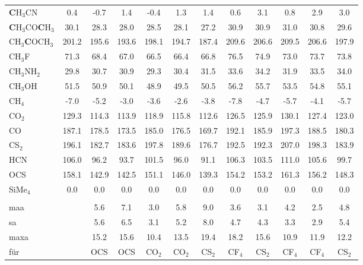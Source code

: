 \begin{table}[ht!]
{\begin{tabular}{lc|ccccc|ccccc}
    \textbf{C}H$_{3}$CN & 0.4   & -0.7  & 1.4   & -0.4  & 1.3   & 1.4   & 0.6   & 3.1   & 0.8   & 2.9   & 3.0 \\
    \textbf{C}H$_{3}$CO\textbf{C}H$_{3}$ & 30.1  & 28.3  & 28.0  & 28.5  & 28.1  & 27.2  & 30.9  & 30.9  & 31.0  & 30.8  & 29.6 \\
    CH$_{3}$\textbf{C}OCH$_{3}$ & 201.2 & 195.6 & 193.6 & 198.1 & 194.7 & 187.4 & 209.6 & 206.6 & 209.5 & 206.6 & 197.9 \\
    CH$_{3}$F  & 71.3  & 68.4  & 67.0  & 66.5  & 66.4  & 66.8  & 76.5  & 74.9  & 73.0  & 73.7  & 73.8 \\
    CH$_{3}$NH$_{2}$ & 29.8  & 30.7  & 30.9  & 29.3  & 30.4  & 31.5  & 33.6  & 34.2  & 31.9  & 33.5  & 34.0 \\
    CH$_{3}$OH & 51.5  & 50.9  & 50.1  & 48.9  & 49.5  & 50.5  & 56.2  & 55.7  & 53.5  & 54.8  & 55.1 \\
    CH$_{4}$   & -7.0  & -5.2  & -3.0  & -3.6  & -2.6  & -3.8  & -7.8  & -4.7  & -5.7  & -4.1  & -5.7 \\
    CO$_{2}$   & 129.3 & 114.3 & 113.9 & 118.9 & 115.8 & 112.6 & 126.5 & 125.9 & 130.1 & 127.4 & 123.0 \\
    CO    & 187.1 & 178.5 & 173.5 & 185.0 & 176.5 & 169.7 & 192.1 & 185.9 & 197.3 & 188.5 & 180.3 \\
    CS$_{2}$   & 196.1 & 182.7 & 183.6 & 197.8 & 189.6 & 176.7 & 192.5 & 192.3 & 207.0 & 198.3 & 183.9 \\
    HCN   & 106.0 & 96.2  & 93.7  & 101.5 & 96.0  & 91.1  & 106.3 & 103.5 & 111.0 & 105.6 & 99.7 \\
    OCS   & 158.1 & 142.9 & 142.5 & 151.1 & 146.0 & 139.3 & 154.2 & 153.2 & 161.3 & 156.2 & 148.3 \\
    SiMe$_{4}$ & 0.0   & 0.0   & 0.0   & 0.0   & 0.0   & 0.0   & 0.0   & 0.0   & 0.0   & 0.0   & 0.0 \\
          &       &       &       &       &       &       &       &       &       &       &  \\
    \ac{maa}   &       & 5.6   & 7.1   & 3.0   & 5.8   & 9.0   & 3.6   & 3.1   & 4.2   & 2.5   & 4.8 \\
    \ac{sa}   &       & 5.6   & 6.5   & 3.1   & 5.2   & 8.0   & 4.7   & 4.3   & 3.3   & 2.9   & 5.4 \\
    \ac{maxa}  &       & 15.2  & 15.6  & 10.4  & 13.5  & 19.4  & 18.2  & 15.6  & 10.9  & 11.9  & 12.2 \\
    für   &       & OCS   & OCS   & CO$_{2}$   & CO$_{2}$   & CS$_{2}$   & CF$_{4}$   & CS$_{2}$   & CF$_{4}$   & CF$_{4}$   & CS$_{2}$ \\
    \end{tabular}%
  \label{tab:cshifts}}%
\end{table}%

